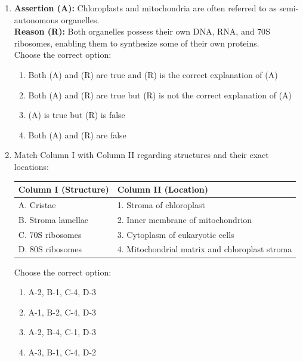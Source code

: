 \documentclass[11pt, a4paper]{article}
\begin{document}
\begin{enumerate}[label=\textbf{\arabic*.}, leftmargin=*, itemsep=8pt]
    \item \textbf{Assertion (A):} Chloroplasts and mitochondria are often referred to as semi-autonomous organelles.\\
    \textbf{Reason (R):} Both organelles possess their own DNA, RNA, and $70\text{S}$ ribosomes, enabling them to synthesize some of their own proteins.\\
    Choose the correct option:
    \begin{enumerate}[label=(\alph*)]
        \item Both (A) and (R) are true and (R) is the correct explanation of (A)
        \item Both (A) and (R) are true but (R) is not the correct explanation of (A)
        \item (A) is true but (R) is false
        \item Both (A) and (R) are false
    \end{enumerate}

    \item Match Column I with Column II regarding structures and their exact locations:
    \begin{center}
    \begin{tabular}{@{}ll@{}}
        \toprule
        \textbf{Column I (Structure)} & \textbf{Column II (Location)} \\
        \midrule
        A. Cristae & 1. Stroma of chloroplast \\
        B. Stroma lamellae & 2. Inner membrane of mitochondrion \\
        C. $70\text{S}$ ribosomes & 3. Cytoplasm of eukaryotic cells \\
        D. $80\text{S}$ ribosomes & 4. Mitochondrial matrix and chloroplast stroma \\
        \bottomrule
    \end{tabular}
    \end{center}
    Choose the correct option:
    \begin{enumerate}[label=(\alph*)]
        \item A-2, B-1, C-4, D-3
        \item A-1, B-2, C-4, D-3
        \item A-2, B-4, C-1, D-3
        \item A-3, B-1, C-4, D-2
    \end{enumerate}


\end{enumerate}
\end{document}
